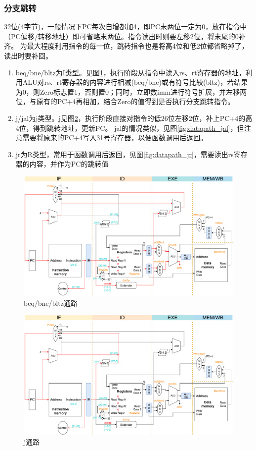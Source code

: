 \subsubsection{分支跳转}
32位(4字节)，一般情况下PC每次自增都加4，即PC末两位一定为0，放在指令中（PC偏移/转移地址）即可省略末两位。指令读出时则要左移2位，将末尾的0补齐。
为最大程度利用指令的每一位，跳转指令也是将高4位和低2位都省略掉了，读出时要补回。
\begin{enumerate}
	\item beq/bne/bltz为I类型。见图\ref{fig:datapath_beq}，执行阶段从指令中读入rs、rt寄存器的地址，利用ALU对rs、rt寄存器的内容进行相减(beq/bne)或有符号比较(bltz)，若结果为0，则Zero标志置1，否则置0；同时，立即数imm进行符号扩展，并左移两位，与原有的PC+4再相加，结合Zero的值得到是否执行分支跳转指令。
	\item j/jal为j类型。j见图\ref{fig:datapath_j}，执行阶段直接对指令的低26位左移2位，补上PC+4的高4位，得到跳转地址，更新PC。
	jal的情况类似，见图\ref{fig:datapath_jal}，但注意需要将原来的PC+4写入31号寄存器，以便函数调用后返回。
	\item jr为R类型，常用于函数调用后返回，见图\ref{fig:datapath_jr}，需要读出rs寄存器的内容，并作为PC的跳转值
\end{enumerate}
\begin{figure}[H]
\centering
\includegraphics[width=\linewidth]{fig/Datapath-beq.pdf}
\caption{beq/bne/bltz通路}
\label{fig:datapath_beq}
\end{figure}
\begin{figure}[H]
\centering
\includegraphics[width=\linewidth]{fig/Datapath-j.pdf}
\caption{j通路}
\label{fig:datapath_j}
\end{figure}
